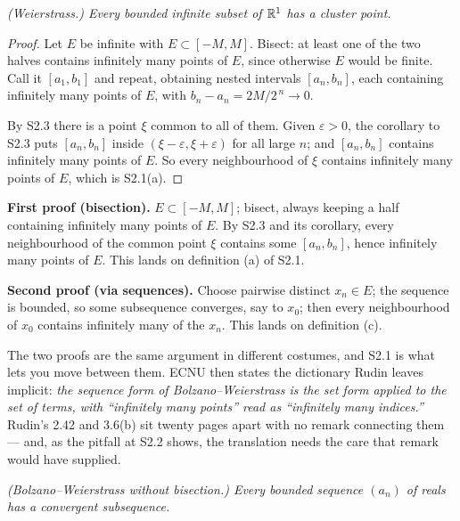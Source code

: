\emph{(Weierstrass.) Every bounded infinite subset of $\mathbb{R}^1$ has a cluster
point.}
\begin{proof}
Let $E$ be infinite with $E \subset [-M,M]$. Bisect: at least one of the two
halves contains infinitely many points of $E$, since otherwise $E$ would be
finite. Call it $[a_1,b_1]$ and repeat, obtaining nested intervals
$[a_n,b_n]$, each containing infinitely many points of $E$, with
$b_n - a_n = 2M/2^{\,n} \to 0$.

By S2.3 there is a point $\xi$ common to all of them. Given $\varepsilon>0$,
the corollary to S2.3 puts $[a_n,b_n]$ inside $(\xi-\varepsilon,
\xi+\varepsilon)$ for all large $n$; and $[a_n,b_n]$ contains infinitely
many points of $E$. So every neighbourhood of $\xi$ contains infinitely many
points of $E$, which is S2.1(a).
\end{proof}

\begin{deeper}
\textbf{First proof (bisection).} $E \subset [-M,M]$; bisect, always keeping
a half containing infinitely many points of $E$. By S2.3 and its corollary,
every neighbourhood of the common point $\xi$ contains some $[a_n,b_n]$,
hence infinitely many points of $E$. This lands on definition (a) of S2.1.

\smallskip
\textbf{Second proof (via sequences).} Choose pairwise distinct
$x_n \in E$; the sequence is bounded, so some subsequence converges, say to
$x_0$; then every neighbourhood of $x_0$ contains infinitely many of the
$x_n$. This lands on definition (c).

\smallskip
The two proofs are the same argument in different costumes, and S2.1 is what
lets you move between them. ECNU then states the dictionary Rudin leaves
implicit: \emph{the sequence form of Bolzano--Weierstrass is the set form
applied to the set of terms, with ``infinitely many points'' read as
``infinitely many indices.''} Rudin's 2.42 and 3.6(b) sit twenty pages apart
with no remark connecting them --- and, as the pitfall at S2.2 shows, the
translation needs the care that remark would have supplied.
\end{deeper}

\emph{(Bolzano--Weierstrass without bisection.) Every bounded sequence
$(a_n)$ of reals has a convergent subsequence.}

